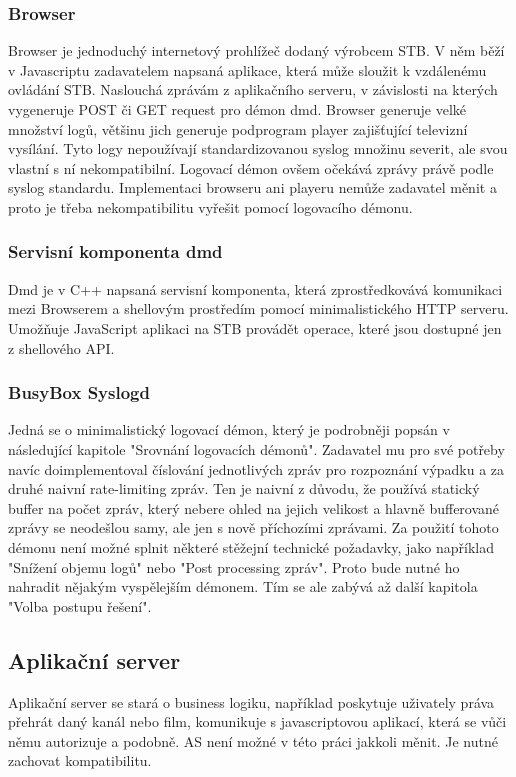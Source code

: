 \documentclass[thesis=B,czech]{FITthesis}[2012/06/26]
\begin{document}
\subsubsection*{Browser}
Browser je jednoduchý internetový prohlížeč dodaný výrobcem STB.
V něm běží v Javascriptu zadavatelem napsaná aplikace, která může sloužit k vzdálenému ovládání STB. Naslouchá zprávám z aplikačního serveru, v závislosti na kterých vygeneruje POST či GET request pro démon dmd.
Browser generuje velké množství logů, většinu jich generuje podprogram player zajišťující televizní vysílání. Tyto logy nepoužívají standardizovanou syslog množinu severit, ale svou vlastní s ní nekompatibilní. Logovací démon ovšem očekává zprávy právě podle syslog standardu. Implementaci browseru ani playeru nemůže zadavatel měnit a proto je třeba nekompatibilitu vyřešit pomocí logovacího démonu.

\subsubsection*{Servisní komponenta dmd}
Dmd je v C++ napsaná servisní komponenta, která zprostředkovává komunikaci mezi Browserem a shellovým prostředím pomocí minimalistického HTTP serveru. Umožňuje JavaScript aplikaci na STB provádět operace, které jsou dostupné jen z shellového API.

\subsubsection*{BusyBox Syslogd}
Jedná se o minimalistický logovací démon, který je podrobněji popsán v následující kapitole "Srovnání logovacích démonů".
Zadavatel mu pro své potřeby navíc doimplementoval číslování jednotlivých zpráv pro rozpoznání výpadku a za druhé naivní rate-limiting zpráv. Ten je naivní z důvodu, že používá statický buffer na počet zpráv, který nebere ohled na jejich velikost a hlavně bufferované zprávy se neodešlou samy, ale jen s nově příchozími zprávami.
Za použití tohoto démonu není možné splnit některé stěžejní technické požadavky, jako například "Snížení objemu logů" nebo "Post processing zpráv". Proto bude nutné ho nahradit nějakým vyspělejším démonem. Tím se ale zabývá až další kapitola "Volba postupu řešení".

\subsection{Aplikační server}
Aplikační server se stará o business logiku, například poskytuje uživately práva přehrát daný kanál nebo film, komunikuje s javascriptovou aplikací, která se vůči němu autorizuje a podobně.
AS není možné v této práci jakkoli měnit. Je nutné zachovat kompatibilitu.
\end{document}
